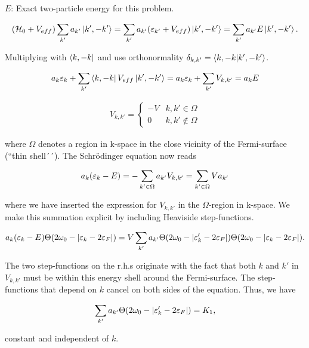 $E$: Exact two-particle energy for this problem. 

\begin{align*}
(\mathcal{H}_0 + V_{eff})\sum_{k'} a_{k'}\ket{k', -k'} = \sum_{k'} a_{k'}(\varepsilon_{k'} + V_{eff})\ket{k', -k'} = \sum_{k'} a_{k'}E\ket{k', -k'}.
\end{align*}

Multiplying with $\bra{k,-k}$ and use orthonormality $\delta_{k,k'} = \braket{k,-k}{k',-k'}$. 

\begin{align*}
a_k \varepsilon_k + \sum_{k'} \bra{k, -k} V_{eff} \ket{k', -k'} = a_k \varepsilon_k + \sum_{k'} V_{k,k'} = a_k E
\end{align*}

\begin{align*}
V_{k,k'} = \begin{cases} -V & k,k' \in \Omega \\
0 & k,k' \notin \Omega \end{cases} 
\end{align*}

where $\Omega$ denotes a region in k-space in the close vicinity of the Fermi-surface (``thin shell´´). The Schrödinger equation now reads 

\begin{align*}
a_k(\varepsilon_k - E) = -\sum_{k' \in \Omega}a_{k'}V_{k,k'} = \sum_{k' \in \Omega}V a_{k'}
\end{align*}

where we have inserted the expression for $V_{k,k'}$ in the $\Omega$-region in k-space. We make this summation explicit by including Heaviside step-functions. 

\begin{align*}
a_k (\varepsilon_k - E) \Theta(2\omega_0 - \abs{\varepsilon_k - 2\varepsilon_F}) = V \sum_{k'} a_{k'} \Theta(2\omega_0 - \abs{\varepsilon_k' - 2\varepsilon_F}) \Theta(2\omega_0 - \abs{\varepsilon_k - 2\varepsilon_F}).
\end{align*}

The two step-functions on the r.h.s originate with the fact that both $k$ and $k'$ in $V_{k,k'}$ must be within this energy shell around the Fermi-surface. The step-functions that depend on $k$ cancel on both sides of the equation. Thus, we have 

\begin{align*}
\sum_{k'} a_{k'} \Theta(2\omega_0 - \abs{\varepsilon_k' - 2\varepsilon_F}) = K_1, 
\end{align*}

constant and independent of $k$. 

